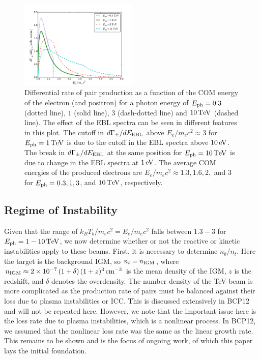 \documentclass[usenatbib,iop,apj,numberedappendix]{aeb_emulateapj_2015}
\def\eV{{\rm eV}} %
\def\TeV{{\rm T}\eV} %
\def\cm{{\rm cm}}
\def\nIGM{n_{\rm IGM}}
\begin{document}
\begin{figure}
 \includegraphics[width=0.5\textwidth]{rates.pdf}
 \caption{Differential rate of pair production as a function of the COM energy of the electron (and positron) for a photon energy of $E_{\rm ph} = 0.3$ (dotted line), $1$ (solid line), $3$ (dash-dotted line) and $10\,\TeV$ (dashed line).  The effect of the EBL spectra can be seen in different features in this plot.  The cutoff in $d\Gamma_{\pm}/dE_{\rm EBL}$ above $E_e/m_e c^2 \approx 3$ for $E_{\rm ph} = 1\,\TeV$ is due to the cutoff in the EBL spectra above $10\,\eV$.  The break in $d\Gamma_{\pm}/dE_{\rm EBL}$ at the same position for $E_{\rm ph} = 10\,\TeV$ is due to change in the EBL spectra at $1\,\eV$. The average COM energies of the produced electrons are $E_e/m_e c^2 \approx 1.3, 1.6, 2,$ and $3$ for $E_{\rm ph} = 0.3, 1, 3$, and $10\,\TeV$, respectively.  
 \label{fig:rates}}
\end{figure}

\subsection{Regime of Instability}

Given that the range of $k_BT_b/m_ec^2 = E_e/m_e c^2$ falls between $1.3-3$ for $E_{\rm ph} = 1-10\,\TeV$, we now determine whether or not the reactive or kinetic instabilities apply to these beams. First, it is necessary to determine $n_b/n_t$.  Here the target is the background IGM, so $n_t = \nIGM$, where $\nIGM \approx 2\times 10^{-7}\,(1+\delta)\,(1+z)^3\,\cm^{-3}$ is the mean density of the IGM, $z$ is the redshift, and $\delta$ denotes the overdensity.  The number density of the TeV beam is more complicated as the production rate of pairs must be balanced against their loss due to plasma instabilities or ICC.  This is discussed extensively in BCP12 and will not be repeated here.  However, we note that the important issue here is the loss rate due to plasma instabilities, which is a nonlinear process.  In BCP12, we assumed that the nonlinear loss rate was the same as the linear growth rate.  This remains to be shown and is the focus of ongoing work, of which this paper lays the initial foundation. 
\end{document}
